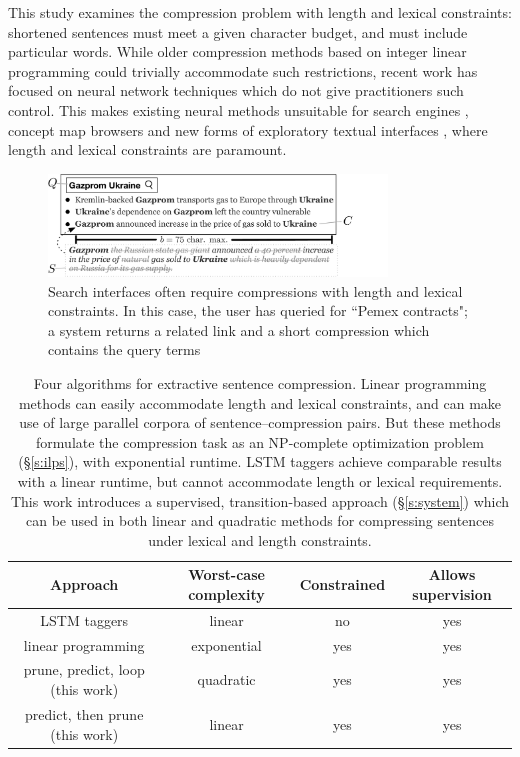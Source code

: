 \documentclass[11pt,a4paper]{article}
\begin{document}
This study examines the compression problem with length and lexical constraints: shortened sentences must meet a given character budget, and must include particular words. While older compression methods based on integer linear programming could trivially accommodate such restrictions, recent work has focused on neural network techniques \cite{filippova2015sentence} which do not give practitioners such control. This makes existing neural methods unsuitable for search engines \cite{hearst2009search}, concept map browsers \cite{falke2017graphdocexplore} and new forms of exploratory textual interfaces \cite{marchionini2006exploratory}, where length and lexical constraints are paramount. 

\begin{figure}[htb!]
\includegraphics[width=9cm]{qf.pdf}
\caption{Search interfaces often require compressions with length and lexical constraints. In this case, the user has queried for ``Pemex contracts"; a system returns a related link and a short compression which contains the query terms}
\label{f:qf}
\end{figure}


\begin{table}[htb!]
\begin{tabular}{cccc}
\textbf{Approach} & \textbf{Worst-case complexity} & \textbf{Constrained} & \textbf{Allows supervision} \\ \hline
LSTM taggers      & linear              & no     &    yes      \\   
linear programming              & exponential         & yes    &    yes   \\
prune, predict, loop  (this work)    & quadratic     & yes    &      yes   \\
predict, then prune  (this work)    & linear           & yes    &      yes   \\
\end{tabular}
\caption{Four algorithms for extractive sentence compression. Linear programming methods \cite{clarke2008global,filippova2013overcoming} can easily accommodate length and lexical constraints, and can make use of large parallel corpora of sentence--compression pairs. But these methods formulate the compression task as an NP-complete optimization problem (\S\ref{s:ilps}), with exponential runtime. LSTM taggers \cite{filippova2015sentence} achieve comparable results with a linear runtime, but cannot accommodate length or lexical requirements. This work introduces a supervised, transition-based approach (\S\ref{s:system}) which can be used in both linear and quadratic methods for compressing sentences under lexical and length constraints.}
\end{table}
\end{document}
